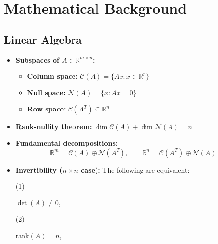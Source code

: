 \section{Mathematical Background}

\subsection{Linear Algebra}
\begin{itemize}
      \item \textbf{Subspaces of \(A\in\mathbb R^{m\times n}\):}
            \begin{itemize}
                  \item \textbf{Column space:}
                        \(\displaystyle \mathcal{C}(A)=\{Ax: x\in\mathbb R^n\}\)
                  \item \textbf{Null space:}
                        \(\displaystyle \mathcal{N}(A)=\{x: Ax=0\}\)
                  \item \textbf{Row space:}
                        \(\displaystyle \mathcal{C}(A^T)\subseteq\mathbb R^n\)
            \end{itemize}
      \item \textbf{Rank-nullity theorem:}
            \(\displaystyle \dim\mathcal{C}(A)+\dim\mathcal{N}(A)=n\)
      \item \textbf{Fundamental decompositions:}
            \[
                  \mathbb R^m=\mathcal{C}(A)\oplus\mathcal{N}(A^T),
                  \qquad
                  \mathbb R^n=\mathcal{C}(A^T)\oplus\mathcal{N}(A)
            \]
      \item \textbf{Invertibility (\(n\times n\) case):}
            The following are equivalent:

            \begin{graytext}(1)\end{graytext} $\det(A)\neq0$,\hspace{2.9em} \begin{graytext}(2)\end{graytext} $\mathrm{rank}(A)=n$,


\end{itemize}

